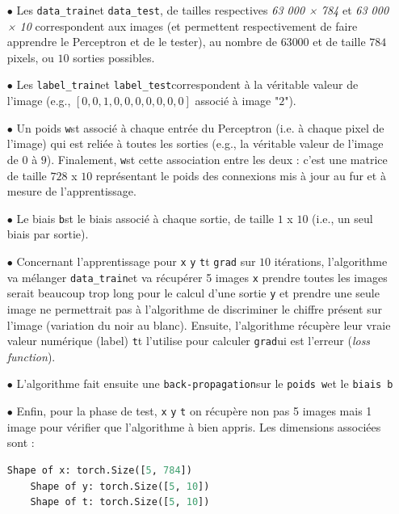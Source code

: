 \documentclass[a4paper]{article}
\newcommand{\code}[2]{\colorbox{light-gray}{\texttt{#1}}}
\begin{document}
	\begin{itemize}
	\item[$\bullet$] Les \code{data\_train}\ et \code{data\_test}\ , de tailles respectives \textit{63 000 × 784} et \textit{63 000 × 10} correspondent aux images (et permettent respectivement de faire apprendre le Perceptron et de le tester), au nombre de $63 000$ et de taille $784$ pixels, ou $10$ sorties possibles.\\

	\item[$\bullet$] Les \code{label\_train}\ et \code{label\_test}\ correspondent à la véritable valeur de l'image (e.g., $[0,0,1,0,0,0,0,0,0,0]$ associé à image "$2$").\\

	\item[$\bullet$] Un poids \code{w} est associé à chaque entrée du Perceptron (i.e. à chaque pixel de l'image) qui est reliée à toutes les sorties (e.g., la véritable valeur de l'image de $0$ à $9$). Finalement, \code{w} est cette association entre les deux : c'est une matrice de taille $728$ x $10$ représentant le poids des connexions mis à jour au fur et à mesure de l'apprentissage.\\

	\item[$\bullet$] Le biais \code{b} est le biais associé à chaque sortie, de taille $1$ x $10$ (i.e., un seul biais par sortie).\\ 

	\item[$\bullet$] Concernant l'apprentissage pour \code{x}, \code{y}, \code{t} et \code{grad}, sur $10$ itérations, l'algorithme va mélanger \code{data\_train}\ et va récupérer 5 images \code{x} : prendre toutes les images serait beaucoup trop long pour le calcul d'une sortie \code{y}, et prendre une seule image ne permettrait pas à l'algorithme de discriminer le chiffre présent sur l'image (variation du noir au blanc). Ensuite, l'algorithme récupère leur vraie valeur numérique (label) \code{t} et l'utilise pour calculer \code{grad} qui est l'erreur (\textit{loss function}).\\

	\item[$\bullet$] L'algorithme fait ensuite une \code{back-propagation}\ sur le \code{poids w}\ et le \code{biais b} .\\
	
	\item[$\bullet$] Enfin, pour la phase de test, \code{x}, \code{y}, \code{t}, on récupère non pas 5 images mais 1 image pour vérifier que l'algorithme à bien appris. Les dimensions associées sont :
		\begin{lstlisting}[language=python]			
	Shape of x: torch.Size([5, 784])
	Shape of y: torch.Size([5, 10])
	Shape of t: torch.Size([5, 10])
		\end{lstlisting}
		
	\end{itemize}
	
\end{document}
